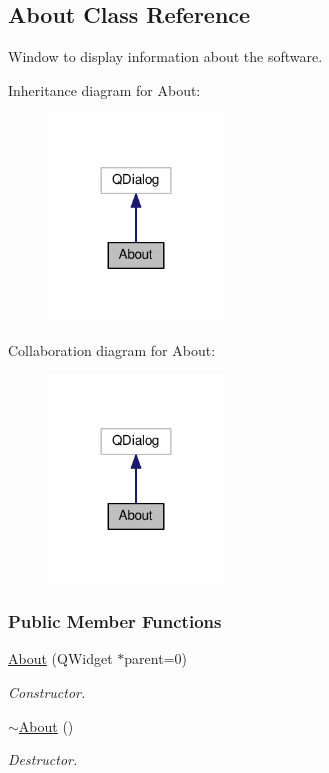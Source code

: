 \hypertarget{class_about}{}\subsection{About Class Reference}
\label{class_about}


Window to display information about the software.  




Inheritance diagram for About\+:\nopagebreak
\begin{figure}[H]
\begin{center}
\leavevmode
\includegraphics[width=132pt]{class_about__inherit__graph}
\end{center}
\end{figure}


Collaboration diagram for About\+:\nopagebreak
\begin{figure}[H]
\begin{center}
\leavevmode
\includegraphics[width=132pt]{class_about__coll__graph}
\end{center}
\end{figure}
\subsubsection*{Public Member Functions}
\begin{DoxyCompactItemize}
\item 
\hyperlink{group___window_gab79599ebbcdeffe0a96e00f010e64177}{About} (Q\+Widget $\ast$parent=0)
\begin{DoxyCompactList}\small\item\em Constructor. \end{DoxyCompactList}\item 
\hyperlink{group___window_gace60197b1b610998908036ee1f802204}{$\sim$\+About} ()
\begin{DoxyCompactList}\small\item\em Destructor. \end{DoxyCompactList}\end{DoxyCompactItemize}


